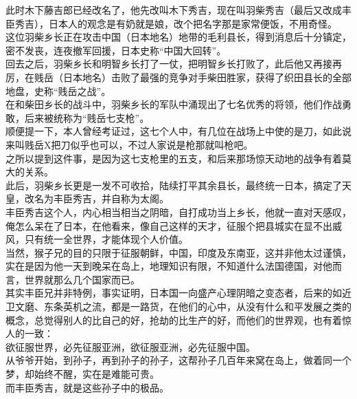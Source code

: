 \begin{multicols}{\theparacolNo}
此时木下藤吉郎已经改名了，他先改叫木下秀吉，现在叫羽柴秀吉（最后又改成丰臣秀吉），日本人的观念是有奶就是娘，改个把名字那是家常便饭，不用奇怪。\\

这位羽柴乡长正在攻击中国（日本地名）地带的毛利县长，得到消息后十分镇定，密不发丧，连夜撤军回援，日本史称“中国大回转”。\\

回去之后，羽柴乡长和明智乡长打了一仗，把明智乡长打败了，此后他又再接再厉，在贱岳（日本地名）击败了最强的竞争对手柴田胜家，获得了织田县长的全部地盘，史称“贱岳之战”。\\

在和柴田乡长的战斗中，羽柴乡长的军队中涌现出了七名优秀的将领，他们作战勇敢，后来被统称为“贱岳七支枪”。\\

顺便提一下，本人曾经考证过，这七个人中，有几位在战场上中使的是刀，如此说来叫贱岳X把刀似乎也可以，不过人家说是枪那就叫枪吧。\\

之所以提到这件事，是因为这七支枪里的五支，和后来那场惊天动地的战争有着莫大的关系。\\

此后，羽柴乡长更是一发不可收拾，陆续打平其余县长，最终统一日本，搞定了天皇，改名为丰臣秀吉，并自称为太阁。\\

丰臣秀吉这个人，内心相当相当之阴暗，自打成功当上乡长，他就一直对天感叹，俺怎么呆在了日本，在他看来，像自己这样的天才，征服个把县城实在显不出威风，只有统一全世界，才能体现个人价值。\\

当然，猴子兄的目的只限于征服朝鲜，中国，印度及东南亚，这并非他太过谨慎，实在是因为他一天到晚呆在岛上，地理知识有限，不知道什么法国德国，对他而言，世界就那么几个国家而已。\\

其实丰臣兄并非特例，事实证明，日本国一向盛产心理阴暗之变态者，后来的如近卫文磨、东条英机之流，都是一路货，在他们的心中，从没有什么和平发展之类的概念，总觉得别人的比自己的好，抢劫的比生产的好，而他们的世界观，也有着惊人的一致：\\

欲征服世界，必先征服亚洲，欲征服亚洲，必先征服中国。\\

从爷爷开始，到孙子，再到孙子的孙子，这帮孙子几百年来窝在岛上，做着同一个梦，却始终不醒，实在是难能可贵。\\

而丰臣秀吉，就是这些孙子中的极品。\\


\end{multicols}
